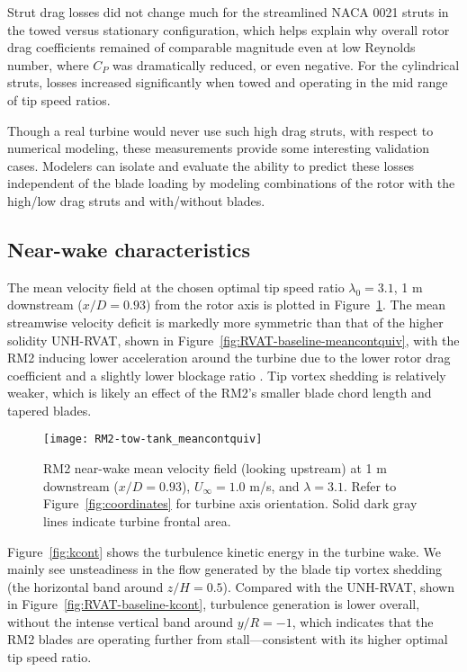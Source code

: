 Strut drag losses did not change much for the streamlined NACA 0021 struts in
the towed versus stationary configuration, which helps explain why overall rotor
drag coefficients remained of comparable magnitude even at low Reynolds number,
where $C_P$ was dramatically reduced, or even negative. For the cylindrical
struts, losses increased significantly when towed and operating in the mid range
of tip speed ratios.

Though a real turbine would never use such high drag struts, with respect to
numerical modeling, these measurements provide some interesting validation
cases. Modelers can isolate and evaluate the ability to predict these losses
independent of the blade loading by modeling combinations of the rotor with the
high/low drag struts and with/without blades.


\subsection{Near-wake characteristics}

The mean velocity field at the chosen optimal tip speed ratio $\lambda_0=3.1$, 1
m downstream ($x/D=0.93$) from the rotor axis is plotted in
Figure~\ref{fig:meancontquiv}. The mean streamwise velocity deficit is markedly
more symmetric than that of the higher solidity UNH-RVAT, shown in
Figure~\ref{fig:RVAT-baseline-meancontquiv}, with the RM2 inducing lower
acceleration around the turbine due to the lower rotor drag coefficient and a
slightly lower blockage ratio \cite{Bachant2015-JoT}. Tip vortex shedding is
relatively weaker, which is likely an effect of the RM2's smaller blade chord
length and tapered blades.

\begin{figure}
    \centering

    \texttt{[image: RM2-tow-tank\_meancontquiv]}
    
    \caption{RM2 near-wake mean velocity field (looking upstream) at 1 m
        downstream ($x/D=0.93$), $U_\infty=1.0$ m/s, and $\lambda=3.1$. Refer to
        Figure~\ref{fig:coordinates} for turbine axis orientation. Solid dark gray
        lines indicate turbine frontal area.}
    
    \label{fig:meancontquiv}
\end{figure}

Figure~\ref{fig:kcont} shows the turbulence kinetic energy in the turbine wake.
We mainly see unsteadiness in the flow generated by the blade tip vortex
shedding (the horizontal band around $z/H=0.5$). Compared with the UNH-RVAT,
shown in Figure~\ref{fig:RVAT-baseline-kcont}, turbulence generation is lower
overall, without the intense vertical band around $y/R=-1$, which indicates that
the RM2 blades are operating further from stall---consistent with its higher
optimal tip speed ratio.


